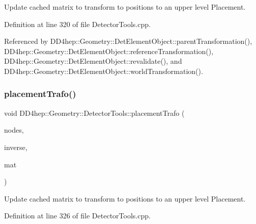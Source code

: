 Update cached matrix to transform to positions to an upper level Placement. 



Definition at line 320 of file Detector\+Tools.\+cpp.



Referenced by D\+D4hep\+::\+Geometry\+::\+Det\+Element\+Object\+::parent\+Transformation(), D\+D4hep\+::\+Geometry\+::\+Det\+Element\+Object\+::reference\+Transformation(), D\+D4hep\+::\+Geometry\+::\+Det\+Element\+Object\+::revalidate(), and D\+D4hep\+::\+Geometry\+::\+Det\+Element\+Object\+::world\+Transformation().

\hypertarget{namespace_d_d4hep_1_1_geometry_1_1_detector_tools_a33a0bf01d4cc18da281b63e2e865c97a}{}\label{namespace_d_d4hep_1_1_geometry_1_1_detector_tools_a33a0bf01d4cc18da281b63e2e865c97a} 
\subsubsection{\texorpdfstring{placement\+Trafo()}{placementTrafo()}\hspace{0.1cm}{\footnotesize\ttfamily [2/2]}}
{\footnotesize\ttfamily void D\+D4hep\+::\+Geometry\+::\+Detector\+Tools\+::placement\+Trafo (\begin{DoxyParamCaption}\item[{const \hyperlink{namespace_d_d4hep_1_1_geometry_1_1_detector_tools_a6cc33285199e04dd336a33e6e62925e6}{Placement\+Path} \&}]{nodes,  }\item[{bool}]{inverse,  }\item[{T\+Geo\+H\+Matrix \&}]{mat }\end{DoxyParamCaption})}



Update cached matrix to transform to positions to an upper level Placement. 



Definition at line 326 of file Detector\+Tools.\+cpp.

\hypertarget{namespace_d_d4hep_1_1_geometry_1_1_detector_tools_aa2a3cf3ac7fbdabef840f02eb0d60d91}{}\label{namespace_d_d4hep_1_1_geometry_1_1_detector_tools_aa2a3cf3ac7fbdabef840f02eb0d60d91} 
